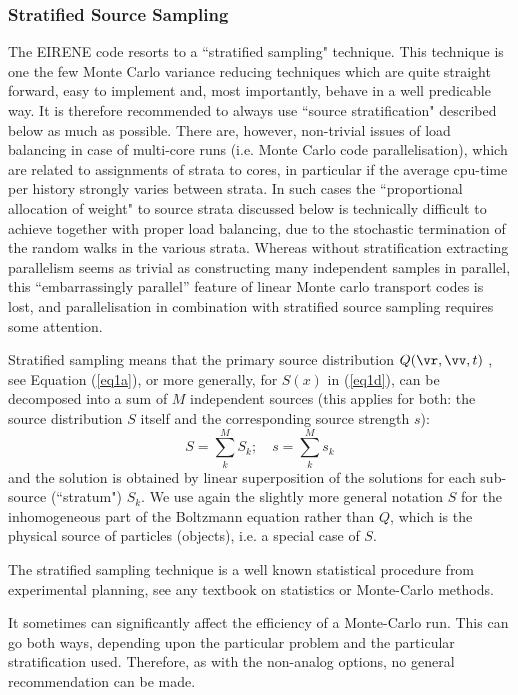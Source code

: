 \subsubsection{Stratified Source Sampling}
\label{sec1.2.1b} The EIRENE code resorts to a ``stratified
sampling" technique. This technique is one the few Monte Carlo variance reducing techniques
which are quite straight forward, easy to implement and, most importantly,
behave in a well predicable way. It is therefore recommended to always use ``source stratification"
described below as much as possible.
There are, however, non-trivial issues of load balancing in case of multi-core runs (i.e. Monte Carlo code parallelisation),
which are related to assignments of strata to cores, in particular if the average cpu-time per history
strongly varies between strata. In such cases the ``proportional allocation of weight" to source strata discussed below is
technically difficult to achieve together with proper load balancing, due to the stochastic termination of the random walks
in the various strata. Whereas without stratification extracting parallelism seems as trivial
as constructing many independent samples in parallel, this ``embarrassingly parallel'' feature of linear Monte carlo transport codes is lost, and
parallelisation in combination with stratified source sampling  requires some attention.




Stratified sampling means that the primary source
distribution $Q(\vr,\vv,t)$ , see Equation (\ref{eq1a}), or more generally, for $S(x)$ in (\ref{eq1d}), can be decomposed into a sum of
$M$ independent sources (this applies for both: the source distribution $S$ itself and the corresponding source strength $s$):
\begin{equation}\label{sss}
S = \sum_k^{M} S_k ; \quad s=\sum_k^{M} s_k
\end{equation}
and the solution is obtained
by linear superposition of the solutions for each sub-source
(``stratum") $S_k$. We use again the slightly more general notation $S$ for the inhomogeneous part of the Boltzmann equation
rather than $Q$, which is the physical source of particles (objects), i.e. a special case of $S$.

The stratified sampling technique is a well known statistical
procedure from experimental planning, see any textbook on statistics or Monte-Carlo methods.

It sometimes can significantly affect the efficiency of a
Monte-Carlo run. This can go both ways, depending upon the
particular problem and the particular stratification used.
Therefore, as with the non-analog options, no general
recommendation can be made.

